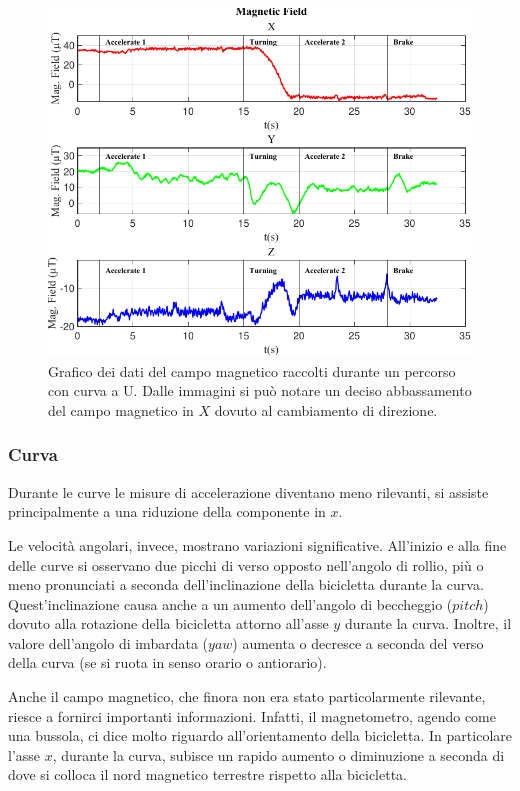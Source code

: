 \documentclass[class=article]{standalone}
\begin{document}
\begin{center}
		\begin{figure}[h]
			\centering\includegraphics[width=.9\textwidth]{img/Mag CurvaUF.pdf}
			\caption[]{Grafico dei dati del campo magnetico raccolti durante un percorso con curva a U. Dalle immagini si può notare un deciso abbassamento del campo magnetico in \(X\) dovuto al cambiamento di direzione.}
			\label{fig:MagCurvaU}
		\end{figure}
	\end{center}
	
	\subsubsection{Curva}	
	Durante le curve le misure di accelerazione diventano meno rilevanti, si assiste principalmente a una riduzione della componente in \(x\).
	
	Le velocità angolari, invece, mostrano variazioni significative. All'inizio e alla fine delle curve si osservano due picchi di verso opposto nell'angolo di rollio, più o meno pronunciati a seconda dell'inclinazione della bicicletta durante la curva.
	Quest'inclinazione causa anche a un aumento dell'angolo di beccheggio (\(pitch\)) dovuto alla rotazione della bicicletta attorno all'asse \(y\) durante la curva.
	Inoltre, il valore dell'angolo di imbardata (\(yaw\)) aumenta o decresce a seconda del verso della curva (se si ruota in senso orario o antiorario).
	
	Anche il campo magnetico, che finora non era stato particolarmente rilevante, riesce a fornirci importanti informazioni. Infatti, il magnetometro, agendo come una bussola, ci dice molto riguardo all'orientamento della bicicletta. In particolare l'asse \(x\), durante la curva, subisce un rapido aumento o diminuzione a seconda di dove si colloca il nord magnetico terrestre rispetto alla bicicletta.
	
	
		
\end{document}
